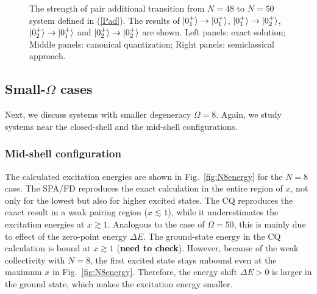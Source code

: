 \documentclass[%
superscriptaddress,
preprint,
showpacs,
nofootinbib,
amsmath,amssymb,
prc,
floatfix ]%
{revtex4-1}
\begin{document}
\begin{figure}[htbp]
 \begin{minipage}{0.33\hsize}
 \begin{center}
 \end{center}
 \captionsetup{labelformat=empty,labelsep=none}
 \end{minipage}
 \begin{minipage}{0.33\hsize}
 \begin{center}
 \end{center}
 \captionsetup{labelformat=empty,labelsep=none}
 \end{minipage}
 \begin{minipage}{0.33\hsize}
 \begin{center}
 \end{center}
 \captionsetup{labelformat=empty,labelsep=none}
 \end{minipage}
 \caption{The strength of pair additional transition from $N=48$ to $N=50$ system defined in (\ref{Pad}). The results of $\ket{0_1^+}\to\ket{0_1^+}$, $\ket{0_1^+}\to\ket{0_2^+}$, $\ket{0_2^+}\to\ket{0_1^+}$ and $\ket{0_2^+}\to\ket{0_2^+}$ are shown. Left panels: exact solution; Middle panels: canonical quantization; Right panels: semiclassical approach.}
 \label{fig:N50Pad}
\end{figure}


\subsection{Small-$\Omega$ cases}

Next, we discuss systems with smaller degeneracy $\Omega=8$.
Again, we study systems near the closed-shell and the mid-shell configurations.

\subsubsection{Mid-shell configuration}

The calculated excitation energies are shown in Fig.~\ref{fig:N8energy}
for the $N=8$ case.
The SPA/FD reproduces the exact calculation in the entire region of $x$,
not only for the lowest but also for higher excited states.
The CQ reproduces the exact result in a weak pairing region ($x\lesssim 1$),
while it underestimates the excitation energies at $x\gtrsim 1$.
Analogous to the case of $\Omega=50$,
this is mainly due to effect of the zero-point energy $\Delta E$.
The ground-state energy in the CQ calculation 
is bound at $x\gtrsim 1$ ({\bf need to check}).
However, because of the weak collectivity with $N=8$,
the first excited state stays unbound even at the maximum $x$ in 
Fig.~\ref{fig:N8energy}.
Therefore, the energy shift $\Delta E>0$ is larger in the ground state,
which makes the excitation energy smaller.
\end{document}
